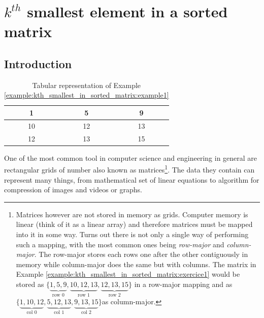 %



\chapter{$k^{th}$ smallest element in a sorted matrix}
\label{ch:kth_smallest_in_sorted_matrix}
\section*{Introduction}
\begin{table}
    \centering
    \begin{framed}  
    \begin{tabular}{|c|c|c|}
    \hline
    1  & 5  & 9  \\ \hline
    10 & 12 & 13 \\ \hline
    12 & 13 & 15 \\ \hline
\end{tabular}%
\caption{Tabular representation of Example \ref{example:kth_smallest_in_sorted_matrix:example1}}
\label{tab:kth_smallest_in_sorted_matrix:example1}
\end{framed}
\end{table} 

One of the most common tool in computer science and engineering in general are rectangular grids of number also known as matrices\footnote{Matrices however are not stored in memory as grids. Computer memory is linear (think of it as a linear array) and therefore matrices must be mapped into it in some way. Turns out there is not only a single way of performing such a mapping, with the most common ones being \textit{row-major} and \textit{column-major}. The row-major stores each rows one after the other contiguously in memory  while column-major does the same but with columns. The matrix in Example \ref{example:kth_smallest_in_sorted_matrix:exercice1} would be stored as $\{\underbrace{1,5,9}_{\text{row 0}},\underbrace{10,12,13}_{\text{row 1}},\underbrace{12,13,15}_{\text{row 2}}\}$ in a row-major mapping and as $\{\underbrace{1,10,12}_{\text{col 0}},\underbrace{5,12,13}_{\text{col 1}},\underbrace{9,13,15}_{\text{col 2}}\}$as column-major.}. The data they  contain can represent many things, from mathematical set of linear equations to algorithm for compression of images and videos or graphs.

